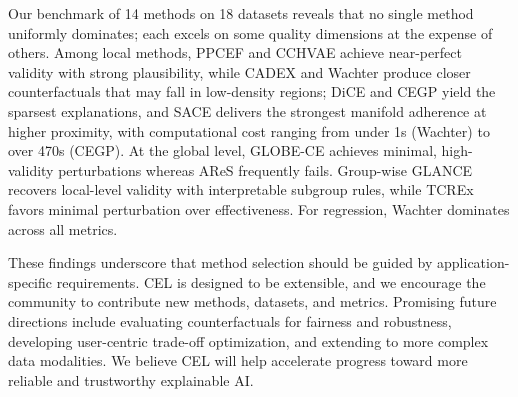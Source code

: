 \documentclass[runningheads]{llncs}
\begin{document}
Our benchmark of 14 methods on 18 datasets reveals that no single method uniformly dominates; each excels on some quality dimensions at the expense of others. Among local methods, PPCEF and CCHVAE achieve near-perfect validity with strong plausibility, while CADEX and Wachter produce closer counterfactuals that may fall in low-density regions; DiCE and CEGP yield the sparsest explanations, and SACE delivers the strongest manifold adherence at higher proximity, with computational cost ranging from under 1s (Wachter) to over 470s (CEGP). At the global level, GLOBE-CE achieves minimal, high-validity perturbations whereas AReS frequently fails. Group-wise GLANCE recovers local-level validity with interpretable subgroup rules, while TCREx favors minimal perturbation over effectiveness. For regression, Wachter dominates across all metrics.

These findings underscore that method selection should be guided by application-specific requirements. CEL is designed to be extensible, and we encourage the community to contribute new methods, datasets, and metrics. Promising future directions include evaluating counterfactuals for fairness and robustness, developing user-centric trade-off optimization, and extending to more complex data modalities. We believe CEL will help accelerate progress toward more reliable and trustworthy explainable AI.








\end{document}

